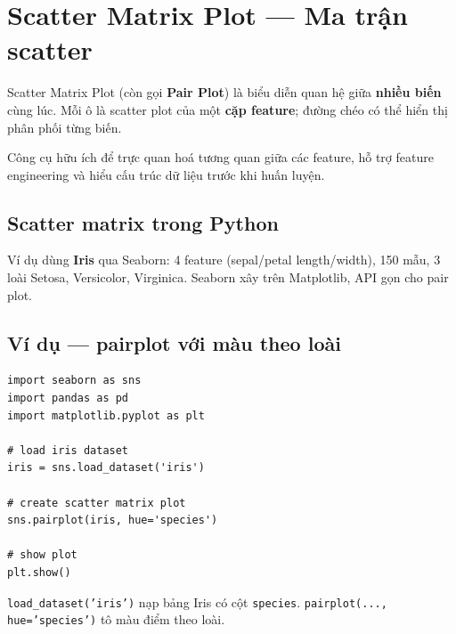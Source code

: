 \section{Scatter Matrix Plot --- Ma trận scatter}
\label{sec:scatter-matrix}

\begin{dinhnghia}[title={Scatter Matrix Plot}]
Scatter Matrix Plot (còn gọi \textbf{Pair Plot}) là biểu diễn quan hệ giữa \textbf{nhiều biến} cùng lúc.
Mỗi ô là scatter plot của một \textbf{cặp feature}; đường chéo có thể hiển thị phân phối từng biến.
\end{dinhnghia}

\begin{ynghia}[title={Vai trò trong ML}]
Công cụ hữu ích để trực quan hoá tương quan giữa các feature, hỗ trợ feature engineering và hiểu cấu trúc dữ liệu trước khi huấn luyện.
\end{ynghia}

\subsection{Scatter matrix trong Python}

\begin{phuongphap}[title={Dataset và thư viện}]
Ví dụ dùng \textbf{Iris} qua Seaborn: 4 feature (sepal/petal length/width), 150 mẫu, 3 loài Setosa, Versicolor, Virginica.
Seaborn xây trên Matplotlib, API gọn cho pair plot.
\end{phuongphap}

\subsection{Ví dụ --- pairplot với màu theo loài}

\begin{vidu}[title={Code}]
\begin{lstlisting}
import seaborn as sns
import pandas as pd
import matplotlib.pyplot as plt

# load iris dataset
iris = sns.load_dataset('iris')

# create scatter matrix plot
sns.pairplot(iris, hue='species')

# show plot
plt.show()
\end{lstlisting}

\texttt{load\_dataset('iris')} nạp bảng Iris có cột \texttt{species}.
\texttt{pairplot(..., hue='species')} tô màu điểm theo loài.
\end{vidu}

